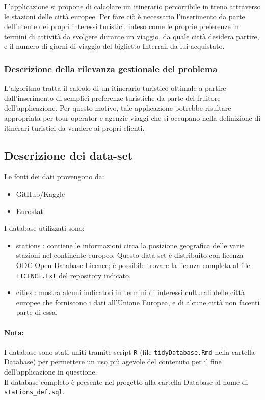 \documentclass[12pt, a4paper]{article}
\begin{document}
	L'applicazione si propone di calcolare un itinerario percorribile in treno attraverso le stazioni delle città europee. Per fare ciò è necessario l'inserimento da parte dell'utente dei propri interessi turistici, inteso come le proprie preferenze in termini di attività da svolgere durante un viaggio, da quale città desidera partire, e il numero di giorni di viaggio del biglietto Interrail da lui acquistato. 
	
	\subsubsection{ Descrizione della rilevanza gestionale del problema}
	
	L'algoritmo tratta il calcolo di un itinerario turistico ottimale a partire dall'inserimento di semplici preferenze turistiche da parte del fruitore dell'applicazione. Per questo motivo, tale applicazione potrebbe risultare appropriata per tour operator e agenzie viaggi che si occupano nella definizione di itinerari turistici da vendere ai propri clienti.
	
	\subsection{ Descrizione dei data-set} \label{dbs}
	
	Le fonti dei dati provengono da:
	\begin{itemize}
		\item GitHub/Kaggle
		\item Eurostat
	\end{itemize}	
	I database utilizzati sono:
	\begin{itemize}
		\item  \href{https://github.com/trainline-eu/stations}{stations} : contiene le informazioni circa la posizione geografica delle varie stazioni nel continente europeo. Questo data-set è distribuito con licenza ODC Open Database Licence; è possibile trovare la licenza completa al file \verb*|LICENCE.txt| del repository indicato.
		\item \href{https://ec.europa.eu/eurostat/databrowser/view/urb_ctour/default/table?lang=en}{cities} : mostra alcuni indicatori in termini di interessi culturali delle città europee che forniscono i dati all'Unione Europea, e di alcune città non facenti parte di essa.
	\end{itemize}
	
	\paragraph{Nota: \\}I database sono stati uniti tramite script \verb*|R| (file \verb*|tidyDatabase.Rmd| nella cartella Database) per permettere un uso più agevole del contenuto per il fine dell'applicazione in questione. \\Il database completo è presente nel progetto alla cartella Database al nome di  \verb*|stations_def.sql|.
	
\end{document}
